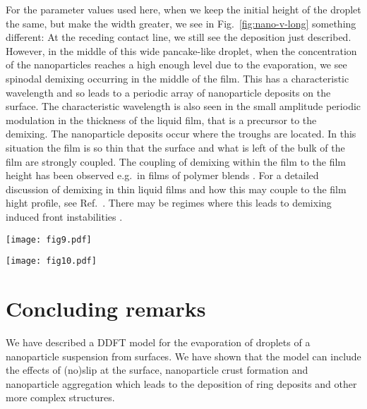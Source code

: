 \documentclass[journal=langd5,manuscript=article]{achemso}
\def\e{\varepsilon}
\begin{document}
For the parameter values used here, when we keep the initial height of the droplet the same, but make the width greater, we see in Fig.~\ref{fig:nano-v-long} something different: At the receding contact line, we still see the deposition just described. However, in the middle of this wide pancake-like droplet, when the concentration of the nanoparticles reaches a high enough level due to the evaporation, we see spinodal demixing occurring in the middle of the film. This has a characteristic wavelength and so leads to a periodic array of nanoparticle deposits on the surface. The characteristic wavelength is also seen in the small amplitude periodic modulation in the thickness of the liquid film, that is a precursor to the demixing. The nanoparticle deposits occur where the troughs are located. In this situation the film is so thin that the surface and what is left of the bulk of the film are strongly coupled. The coupling of demixing within the film to the film height has been observed e.g.\ in films of polymer blends \cite{thomas2010wetting}. For a detailed discussion of demixing in thin liquid films and how this may couple to the film hight profile, see Ref.~. There may be regimes where this leads to demixing induced front instabilities \cite{vancea2011pattern, yerushalmi1999alternative}.

\begin{figure*}
\texttt{[image: fig9.pdf]}
\caption{%
  Snapshots taken from simulating a droplet of nanoparticle suspension
  evaporating from a surface with $\e_{wl}/\e_{ll}=0.8$,
  $\e_{ln}/\e_{ll} = 0.75$, $\e_{nn}/\e_{ll} = 1.5$, $k_BT/\e_{ll} =
  1.3$ and slip $s=v=1$ in a $128 \times 64$ system.
}
\label{fig:nano-long}
\end{figure*}

\begin{figure*}
\texttt{[image: fig10.pdf]}
\caption{%
  Snapshots taken from simulating a pancake-like droplet of
  nanoparticle suspension
  evaporating from a surface with $\varepsilon_{wl}=0.8$,
  $\varepsilon_{ln} = 0.75$, $\varepsilon_{nn} = 1.5$ and $k_BT/\e_{ll} = 1.3$
  in a $1024 \times 64$ system.
}
\label{fig:nano-v-long}
\end{figure*}

\section{Concluding remarks}\label{conclusion}

We have described a DDFT model for the evaporation of droplets of a nanoparticle suspension from surfaces. We have shown that the model can include the effects of (no)slip at the surface, nanoparticle crust formation and nanoparticle aggregation which leads to the deposition of ring deposits and other more complex structures.
\end{document}
